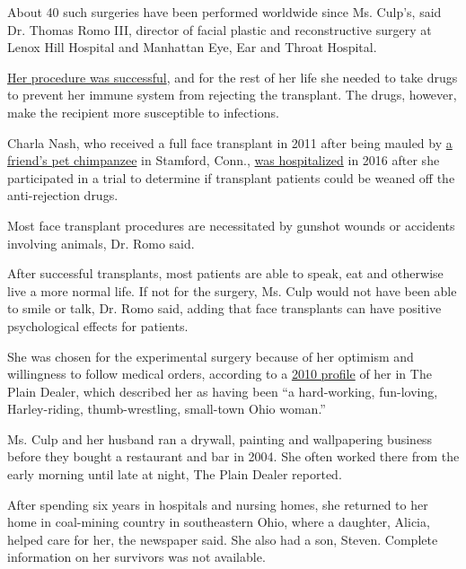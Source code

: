 About 40 such surgeries have been performed worldwide since Ms. Culp's,
said Dr. Thomas Romo III, director of facial plastic and reconstructive
surgery at Lenox Hill Hospital and Manhattan Eye, Ear and Throat
Hospital.

\href{https://www.nytimes3xbfgragh.onion/2008/12/18/health/s18face.html}{Her
procedure was successful}, and for the rest of her life she needed to
take drugs to prevent her immune system from rejecting the transplant.
The drugs, however, make the recipient more susceptible to infections.

Charla Nash, who received a full face transplant in 2011 after being
mauled by
\href{https://abcnews.go.com/US/sandra-herold-owner-chimp-travis-mauled-charla-nash-dies/story?id=10740652}{a
friend's pet chimpanzee} in Stamford, Conn.,
\href{https://www.nytimes3xbfgragh.onion/2016/05/06/nyregion/chimpanzee-attack-victim-who-got-face-transplant-is-hospitalized.html}{was
hospitalized} in 2016 after she participated in a trial to determine if
transplant patients could be weaned off the anti-rejection drugs.

Most face transplant procedures are necessitated by gunshot wounds or
accidents involving animals, Dr. Romo said.

After successful transplants, most patients are able to speak, eat and
otherwise live a more normal life. If not for the surgery, Ms. Culp
would not have been able to smile or talk, Dr. Romo said, adding that
face transplants can have positive psychological effects for patients.

She was chosen for the experimental surgery because of her optimism and
willingness to follow medical orders, according to a
\href{https://www.cleveland.com/healthfit/2010/11/woman_who_underwent_first_near.html}{2010
profile} of her in The Plain Dealer, which described her as having been
``a hard-working, fun-loving, Harley-riding, thumb-wrestling, small-town
Ohio woman.''

Ms. Culp and her husband ran a drywall, painting and wallpapering
business before they bought a restaurant and bar in 2004. She often
worked there from the early morning until late at night, The Plain
Dealer reported.

After spending six years in hospitals and nursing homes, she returned to
her home in coal-mining country in southeastern Ohio, where a daughter,
Alicia, helped care for her, the newspaper said. She also had a son,
Steven. Complete information on her survivors was not available.

